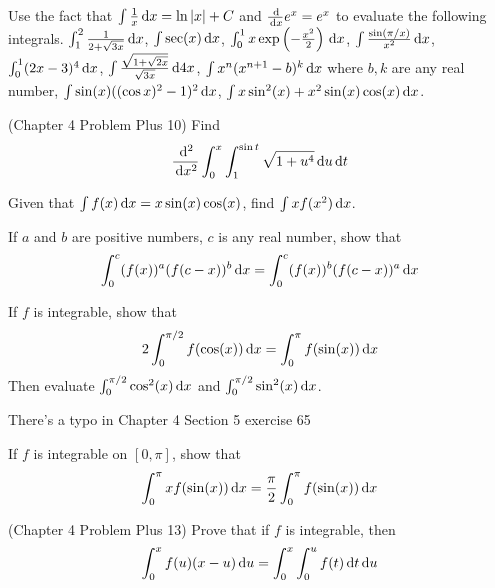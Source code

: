\documentclass[Calculus 1 Recitation.tex]{subfiles}
\begin{document}
\begin{myleftlinebox}
	Use the fact that $\int \frac{1}{x}\,\mathrm{d} x=\ln\left\vert x\right\vert+C$ and $\frac{\,\mathrm{d}}{\,\mathrm{d} x}e^x=e^x$ to evaluate the following integrals. $\int_1^2 \frac{1}{2+\sqrt{3x}}\,\mathrm{d} x$, $\int \sec(x)\,\mathrm{d} x$, $\int_0^1 x \exp\left( -\frac{x^2}{2} \right)\,\mathrm{d} x$, $\int \frac{\sin(\pi/x)}{x^2}\,\mathrm{d} x$, $\int_0^1 (2x-3)^4 \,\mathrm{d} x$, $\int \frac{\sqrt{1+\sqrt{2x}}}{\sqrt{3x}}\,\mathrm{d} 4x$, $\int x^n(x^{n+1}-b)^k\,\mathrm{d} x$ where $b,k$ are any real number, $\int \sin(x)((\cos x)^2-1)^2\,\mathrm{d} x$, $\int x\sin^2(x)+x^2\sin(x)\cos(x) \,\mathrm{d} x$.
	\tcblower
	\vspace{2em}
\end{myleftlinebox}

\begin{myleftlinebox}
	(Chapter 4 Problem Plus 10) Find
	\[\frac{\,\mathrm{d}^2}{\,\mathrm{d} x^2} \int_0^x \int_1^{\sin t} \sqrt{1+u^4} \,\mathrm{d} u\,\mathrm{d} t\]
	\tcblower
	\vspace{2em}
\end{myleftlinebox}

\begin{myleftlinebox}
	Given that $\int f(x)\,\mathrm{d} x=x\sin(x)\cos(x)$, find $\int xf(x^2)\,\mathrm{d} x$.
	\tcblower
	\vspace{2em}
\end{myleftlinebox}


\begin{myleftlinebox}
	If $a$ and $b$ are positive numbers, $c$ is any real number, show that
	\[\int_0^c (f(x))^a(f(c-x))^b\,\mathrm{d} x = \int_0^c (f(x))^b(f(c-x))^a\,\mathrm{d} x\]
	\tcblower
	\vspace{2em}
\end{myleftlinebox}

\begin{myleftlinebox}
	If $f$ is integrable, show that 
	\[2\int_0^{\pi/2} f(\cos(x))\,\mathrm{d} x=\int_0^\pi f(\sin(x))\,\mathrm{d} x\]
	Then evaluate $\int_0^{\pi/2}\cos^2(x)\,\mathrm{d} x$ and $\int_0^{\pi/2}\sin^2(x)\,\mathrm{d} x$.
	\begin{remark2}
		There's a typo in Chapter 4 Section 5 exercise 65
	\end{remark2}
	\tcblower
	\vspace{2em}
\end{myleftlinebox}

\begin{myleftlinebox}
	If $f$ is integrable on $[0,\pi]$, show that 
	\[\int_0^\pi x f(\sin(x))\,\mathrm{d} x = \frac{\pi}{2}\int_0^\pi f(\sin(x))\,\mathrm{d} x\]
	\tcblower
	\vspace{2em}
\end{myleftlinebox}

\begin{myleftlinebox}
	(Chapter 4 Problem Plus 13) Prove that if $f$ is integrable, then 
	\[\int_0^x f(u)(x-u)\,\mathrm{d} u = \int_0^x \int_0^u f(t)\,\mathrm{d} t\,\mathrm{d} u\]
	\tcblower
	\vspace{2em}
\end{myleftlinebox}
\end{document}
